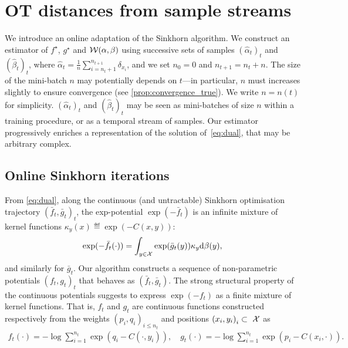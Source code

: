 
\section{OT distances from sample streams}

We introduce an online adaptation of the Sinkhorn algorithm. We construct an estimator of $f^\star$, $g^\star$
and $\mathcal{W}(\alpha,\beta)$ using successive sets of samples ${(\hat \alpha_t)}_t$
and ${(\hat \beta_t)}_t$, where $\hat\alpha_t = \frac{1}{n} \sum_{i=n_t +
1}^{n_{t+1}} \delta_{x_i}$, and we set  $n_0 = 0$ and $n_{t+1} = n_{t} +
n$. The size of the mini-batch $n$ may potentially depends on $t$---in
particular, $n$ must increases slightly to ensure convergence (see
\autoref{prop:convergence_true}). We write $n = n(t)$ for simplicity.
% 
${(\hat \alpha_t)}_t$ and ${(\hat \beta_t)}_t$ may be
seen as mini-batches of size $n$ within a training procedure, or as a temporal
stream of samples.
%
Our estimator progressively enriches a representation of the
solution of~\eqref{eq:dual}, that may be arbitrary complex. 
% 


\subsection{Online Sinkhorn iterations}
\label{sec-online-sink-iter}

From \eqref{eq:dual}, along the continuous (and untractable) Sinkhorn
optimisation trajectory ${(\bar f_t, \bar g_t)}_t$, the exp-potential $\exp(-\bar f_t)$ is an infinite mixture of kernel functions
$\kappa_y(x) \eqdef \exp(-C(x, y))$:
\begin{equation*}
    \exp(-\bar f_t(\cdot)) = 
    \int_{y \in \mathcal{X}} \exp(\bar g_t(y))  \kappa_y  \textrm{d} \beta(y),
\end{equation*}
and similarly for $\bar g_t$. Our algorithm constructs a sequence of non-parametric
potentials $(f_t, g_t)_t$ that behaves as $(\bar f_t, \bar g_t)$. The strong
structural property of the continuous potentials suggests to express
$\exp(-f_t)$ as a finite mixture of kernel functions. That is, $f_t$ and $g_t$
are continuous functions constructed respectively from the weights ${(p_i,
q_i)}_{i \leq n_t}$ and positions ${(x_i, y_i)}_{i} \subset~\mathcal{X}$ as
\begin{align}\label{eq:param}
    f_t(\cdot) = - \log \sum_{i=1}^{n_t} 
    \exp(q_i - C(\cdot, y_i)),\quad
    g_t(\cdot) = - \log \sum_{i=1}^{n_t}
    \exp(p_i - C(x_i, \cdot)).
\end{align}




